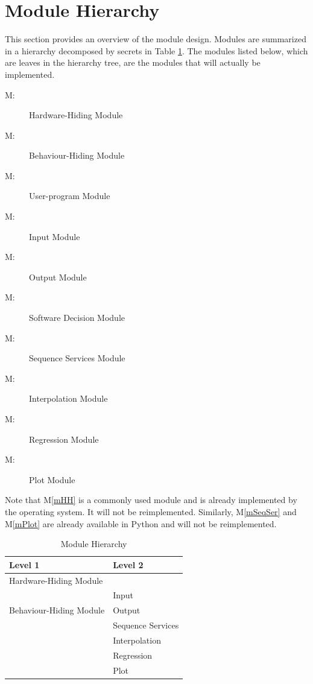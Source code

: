 \documentclass[12pt, titlepage]{article}
\newcounter{mnum}
\newcommand{\mthemnum}{M\themnum}
\newcommand{\mref}[1]{M\ref{#1}}
\begin{document}
\section{Module Hierarchy} \label{SecMH}

This section provides an overview of the module design. Modules are summarized
in a hierarchy decomposed by secrets in Table \ref{TblMH}. The modules listed
below, which are leaves in the hierarchy tree, are the modules that will
actually be implemented.

\begin{description}
\item [ \mthemnum \label{mHH}:] Hardware-Hiding Module
\item [ \mthemnum \label{mBH}:] Behaviour-Hiding Module
\item [ \mthemnum \label{mControl}:] User-program Module
\item [ \mthemnum \label{mInput}:] Input Module
\item [ \mthemnum \label{mOutput}:] Output Module
\item [ \mthemnum \label{mSD}:] Software Decision Module
\item [ \mthemnum \label{mSeqSer}:] Sequence Services Module 
\item [ \mthemnum \label{mInterp}:] Interpolation Module
\item [ \mthemnum \label{mLinearReg}:] Regression Module
\item [ \mthemnum \label{mPlot}:] Plot Module
\end{description}

Note that \mref{mHH} is a commonly used module and is already implemented by the
operating system.  It will not be reimplemented.  Similarly, \mref{mSeqSer} and
\mref{mPlot} are already available in Python and will not be reimplemented.

\begin{table}[h!]
\centering
\begin{tabular}{p{} p{}}
\toprule
\textbf{Level 1} & \textbf{Level 2}\\
\midrule

{Hardware-Hiding Module} & ~ \\
\midrule

\multirow{3}{0.3\textwidth}{Behaviour-Hiding Module}& Input\\
& Output\\

\midrule

\multirow{4}{0.3\textwidth}{Software Decision Module} & Sequence Services\\
& Interpolation\\
& Regression\\
& Plot\\
\bottomrule

\end{tabular}
\caption{Module Hierarchy}
\label{TblMH}
\end{table}
\end{document}
